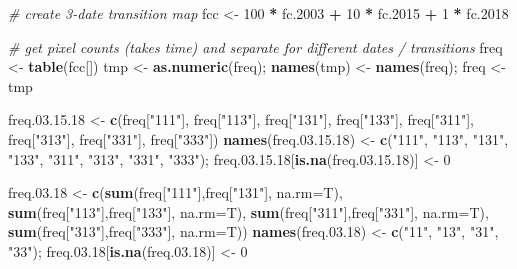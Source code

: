 \documentclass[a4paper, notitlepage, 12pt, krantz2]{krantz}
\newenvironment{Shaded}{\begin{snugshade}}{\end{snugshade}}
\newcommand{\CommentTok}[1]{\textcolor[rgb]{0.56,0.35,0.01}{\textit{#1}}}
\newcommand{\DataTypeTok}[1]{\textcolor[rgb]{0.13,0.29,0.53}{#1}}
\newcommand{\DecValTok}[1]{\textcolor[rgb]{0.00,0.00,0.81}{#1}}
\newcommand{\FloatTok}[1]{\textcolor[rgb]{0.00,0.00,0.81}{#1}}
\newcommand{\KeywordTok}[1]{\textcolor[rgb]{0.13,0.29,0.53}{\textbf{#1}}}
\newcommand{\NormalTok}[1]{#1}
\newcommand{\OperatorTok}[1]{\textcolor[rgb]{0.81,0.36,0.00}{\textbf{#1}}}
\newcommand{\StringTok}[1]{\textcolor[rgb]{0.31,0.60,0.02}{#1}}
\begin{document}
\begin{Shaded}
\begin{Highlighting}[]
\CommentTok{# create 3-date transition map }
\NormalTok{fcc  <-}\StringTok{  }\DecValTok{100} \OperatorTok{*}\StringTok{ }\NormalTok{fc}\FloatTok{.2003} \OperatorTok{+}\StringTok{ }\DecValTok{10} \OperatorTok{*}\StringTok{ }\NormalTok{fc}\FloatTok{.2015} \OperatorTok{+}\StringTok{ }\DecValTok{1} \OperatorTok{*}\StringTok{ }\NormalTok{fc}\FloatTok{.2018}

\CommentTok{# get pixel counts (takes time) and separate for different dates / transitions}
\NormalTok{freq <-}\StringTok{ }\KeywordTok{table}\NormalTok{(fcc[])}
\NormalTok{tmp <-}\StringTok{ }\KeywordTok{as.numeric}\NormalTok{(freq); }\KeywordTok{names}\NormalTok{(tmp) <-}\StringTok{ }\KeywordTok{names}\NormalTok{(freq); freq <-}\StringTok{ }\NormalTok{tmp}

\NormalTok{freq.}\DecValTok{03}\NormalTok{.}\FloatTok{15.18}\NormalTok{        <-}\StringTok{ }\KeywordTok{c}\NormalTok{(freq[}\StringTok{"111"}\NormalTok{], freq[}\StringTok{"113"}\NormalTok{], freq[}\StringTok{"131"}\NormalTok{], freq[}\StringTok{"133"}\NormalTok{], freq[}\StringTok{"311"}\NormalTok{], freq[}\StringTok{"313"}\NormalTok{], freq[}\StringTok{"331"}\NormalTok{], freq[}\StringTok{"333"}\NormalTok{])}
\KeywordTok{names}\NormalTok{(freq.}\DecValTok{03}\NormalTok{.}\FloatTok{15.18}\NormalTok{) <-}\StringTok{ }\KeywordTok{c}\NormalTok{(}\StringTok{"111"}\NormalTok{, }\StringTok{"113"}\NormalTok{, }\StringTok{"131"}\NormalTok{, }\StringTok{"133"}\NormalTok{, }\StringTok{"311"}\NormalTok{, }\StringTok{"313"}\NormalTok{, }\StringTok{"331"}\NormalTok{, }\StringTok{"333"}\NormalTok{); freq.}\DecValTok{03}\NormalTok{.}\FloatTok{15.18}\NormalTok{[}\KeywordTok{is.na}\NormalTok{(freq.}\DecValTok{03}\NormalTok{.}\FloatTok{15.18}\NormalTok{)] <-}\StringTok{ }\DecValTok{0}

\NormalTok{freq.}\FloatTok{03.18}\NormalTok{        <-}\StringTok{ }\KeywordTok{c}\NormalTok{(}\KeywordTok{sum}\NormalTok{(freq[}\StringTok{"111"}\NormalTok{],freq[}\StringTok{"131"}\NormalTok{], }\DataTypeTok{na.rm=}\NormalTok{T), }\KeywordTok{sum}\NormalTok{(freq[}\StringTok{"113"}\NormalTok{],freq[}\StringTok{"133"}\NormalTok{], }\DataTypeTok{na.rm=}\NormalTok{T),}
                       \KeywordTok{sum}\NormalTok{(freq[}\StringTok{"311"}\NormalTok{],freq[}\StringTok{"331"}\NormalTok{], }\DataTypeTok{na.rm=}\NormalTok{T), }\KeywordTok{sum}\NormalTok{(freq[}\StringTok{"313"}\NormalTok{],freq[}\StringTok{"333"}\NormalTok{], }\DataTypeTok{na.rm=}\NormalTok{T))}
\KeywordTok{names}\NormalTok{(freq.}\FloatTok{03.18}\NormalTok{) <-}\StringTok{ }\KeywordTok{c}\NormalTok{(}\StringTok{"11"}\NormalTok{, }\StringTok{"13"}\NormalTok{, }\StringTok{"31"}\NormalTok{, }\StringTok{"33"}\NormalTok{); freq.}\FloatTok{03.18}\NormalTok{[}\KeywordTok{is.na}\NormalTok{(freq.}\FloatTok{03.18}\NormalTok{)] <-}\StringTok{ }\DecValTok{0}


\end{Highlighting}
\end{Shaded}
\end{document}
